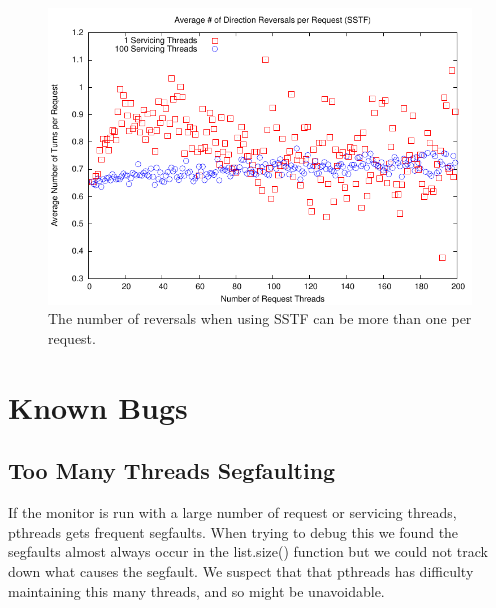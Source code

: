 \documentclass[12pt]{report}
\begin{document}
\begin{figure}[htb!]
    \centering
    \includegraphics[scale=1]{turnsSSTF.pdf}
    \caption{The number of reversals when using SSTF can be more than one per request.}
    \label{fig:turnsSSTF}
\end{figure}

\section{Known Bugs}
\subsection{Too Many Threads Segfaulting}
If the monitor is run with a large number of request or servicing threads, pthreads
gets frequent segfaults. When trying to debug this we found the segfaults
almost always occur in the list.size() function but we could not track down what causes
the segfault. We suspect that that pthreads has difficulty maintaining this many threads,
and so might be unavoidable.


\newpage
\end{document}
